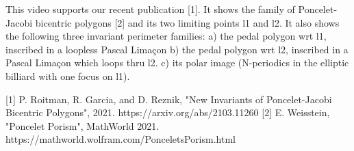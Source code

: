 This video supports our recent publication [1]. It shows the family of Poncelet-Jacobi bicentric polygons [2] and its two limiting points l1 and l2. It also shows the following three invariant perimeter families: 
a) the pedal polygon wrt l1, inscribed in a loopless Pascal Limaçon
b) the pedal polygon wrt l2, inscribed in a Pascal Limaçon which loops thru l2.
c) its polar image (N-periodics in the elliptic billiard with one focus on l1).

[1] P. Roitman, R. Garcia, and D. Reznik, "New Invariants of Poncelet-Jacobi Bicentric Polygons", 2021. https://arxiv.org/abs/2103.11260 
[2] E. Weisstein, "Poncelet Porism", MathWorld 2021. https://mathworld.wolfram.com/PonceletsPorism.html